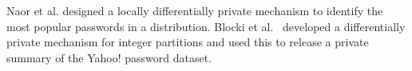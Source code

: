  Naor et al.\cite{CCS:NaoPinRon19} designed a locally differentially private mechanism to identify the most popular passwords in a distribution. Blocki et al.~\cite{NDSS:BloDatBon16} developed a differentially private mechanism for integer partitions and used this to release a private summary of the Yahoo! password dataset. 




